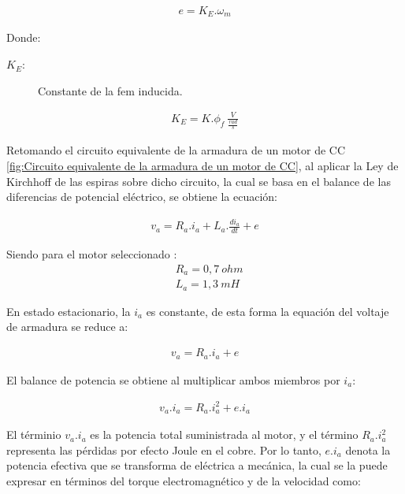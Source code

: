 \documentclass{article}
\begin{document}
\begin{sloppypar}
\begin{align}   \label{eq:e expresada en función de K_E}
    e=K_E.\omega_m
\end{align}

Donde:
\begin{description}
	\item[$K_E:$] Constante de la fem inducida.
\end{description}

\begin{align}   \label{eq:K_E}
    K_E=K.\phi_f\ \frac{V}{\frac{rad}{s}}
\end{align}


Retomando el circuito equivalente de la armadura de un motor de CC \ref{fig:Circuito equivalente de la armadura de un motor de CC}, al aplicar la Ley de Kirchhoff de las espiras sobre dicho circuito, la cual se basa en el balance de las diferencias de potencial eléctrico, se obtiene la ecuación:

\begin{align}   \label{eq:v_a}
    v_a=R_a.i_a+L_a.\frac{di_a}{dt}+e
\end{align}

Siendo para el motor seleccionado \cite{MoogMotorDatasheet}:
\begin{subequations} \label{eq:R_a L_a v}
    \begin{align}
        & \label{eq:Valor de R_a}   R_a=0,7\ ohm
        \\
        & \label{eq:Valor de L_a}   L_a=1,3\ mH
    \end{align}
\end{subequations}

En estado estacionario, la $i_a$ es constante, de esta forma la equación del voltaje de armadura se reduce a:

\begin{align}   \label{eq:v_a reducida}
    v_a=R_a.i_a+e
\end{align}

El balance de potencia se obtiene al multiplicar ambos miembros por $i_a$:

\begin{align}   \label{eq:v_a.i_a}
    v_a.i_a=R_a.i_a^2+e.i_a
\end{align}

El términio $v_a.i_a$ es la potencia total suministrada al motor, y el término $R_a.i_a^2$ representa las pérdidas por efecto Joule en el cobre. Por lo tanto, $e.i_a$ denota la potencia efectiva que se transforma de eléctrica a mecánica, la cual se la puede expresar en términos del torque electromagnético y de la velocidad como:


\end{sloppypar}
\end{document}
